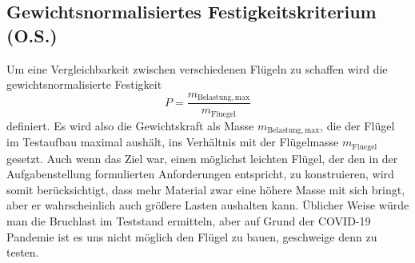 \subsection{Gewichtsnormalisiertes Festigkeitskriterium (O.S.)}
Um eine Vergleichbarkeit zwischen verschiedenen Flügeln zu schaffen wird die gewichtsnormalisierte Festigkeit
\begin{equation}
\label{GewichtF}
	P=\frac{m_{\mathrm{Belastung,max}}}{m_{\mathrm{Fluegel}}}
\end{equation}
definiert. Es wird also die Gewichtskraft als Masse $m_{\mathrm{Belastung,max}}$, die der Flügel im Testaufbau maximal aushält, ins Verhältnis mit der Flügelmasse $m_{\mathrm{Fluegel}}$ gesetzt. Auch wenn das Ziel war, einen möglichst leichten Flügel, der den in der Aufgabenstellung formulierten Anforderungen entspricht, zu konstruieren, wird somit berücksichtigt, dass mehr Material zwar eine höhere Masse mit sich bringt, aber er wahrscheinlich auch größere Lasten aushalten kann. Üblicher Weise würde man die Bruchlast im Teststand ermitteln, aber auf Grund der COVID-19 Pandemie ist es uns nicht möglich den Flügel zu bauen, geschweige denn zu testen.\\
	

